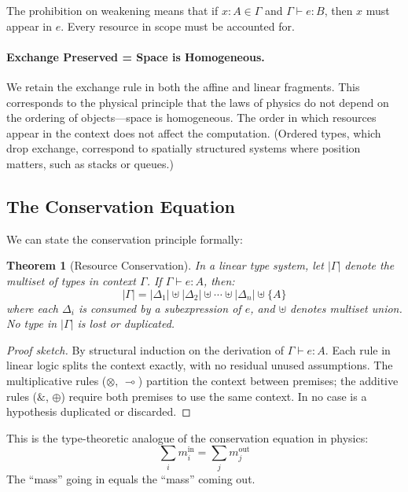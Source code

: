 \documentclass[11pt,a4paper]{article}
\newtheorem{theorem}{Theorem}[section]
\newcommand{\tensor}{\otimes}
\newcommand{\lolli}{\multimap}
\begin{document}
The prohibition on weakening means that if $x : A \in \Gamma$ and
$\Gamma \vdash e : B$, then $x$ must appear in $e$. Every resource
in scope must be accounted for.

\paragraph{Exchange Preserved = Space is Homogeneous.}
We retain the exchange rule in both the affine and linear fragments.
This corresponds to the physical principle that the laws of physics
do not depend on the ordering of objects---space is homogeneous. The
order in which resources appear in the context does not affect the
computation. (Ordered types, which drop exchange, correspond to
spatially structured systems where position matters, such as stacks
or queues.)

\subsection{The Conservation Equation}

We can state the conservation principle formally:

\begin{theorem}[Resource Conservation]
\label{thm:conservation}
In a linear type system, let $|\Gamma|$ denote the multiset of types
in context $\Gamma$. If $\Gamma \vdash e : A$, then:
\[
  |\Gamma| = |\Delta_1| \uplus |\Delta_2| \uplus \cdots \uplus |\Delta_n| \uplus \{A\}
\]
where each $\Delta_i$ is consumed by a subexpression of $e$, and
$\uplus$ denotes multiset union. No type in $|\Gamma|$ is lost or
duplicated.
\end{theorem}

\begin{proof}[Proof sketch]
By structural induction on the derivation of $\Gamma \vdash e : A$.
Each rule in linear logic splits the context exactly, with no
residual unused assumptions. The multiplicative rules ($\tensor$,
$\lolli$) partition the context between premises; the additive rules
($\&$, $\oplus$) require both premises to use the same context.
In no case is a hypothesis duplicated or discarded.
\end{proof}

This is the type-theoretic analogue of the conservation equation in
physics:
\[
  \sum_i m_i^{\text{in}} = \sum_j m_j^{\text{out}}
\]
The ``mass'' going in equals the ``mass'' coming out.


\end{document}
